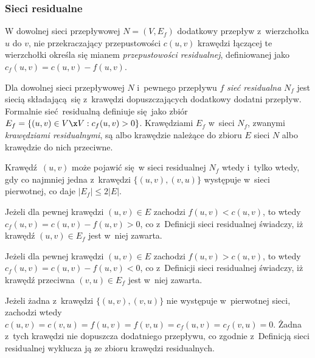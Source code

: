 \subsubsection{\textbf{Sieci residualne}}
\par{
  W dowolnej sieci przepływowej $N=(V, E_f)$ dodatkowy przepływ z~wierzchołka $u$ do $v$, nie przekraczający przepustowości $c(u, v)$ krawędzi łączącej te wierzchołki określa się mianem \emph{przepustowości residualnej}, definiowanej jako $c_f(u ,v) = c(u, v) - f(u, v)$.
  \begin{definition}
    Dla dowolnej sieci przepływowej $N$ i~pewnego przepływu $f$ \emph{sieć residualna} $N_f$ jest siecią składającą się z~krawędzi dopuszczających dodatkowy dodatni przepływ. Formalnie sieć residualną definiuje się jako zbiór $E_f=\{(u, v) \in V \x V: c_f(u,v) > 0\}$.
    Krawędziami $E_f$ w~sieci $N_f$, zwanymi \emph{krawędziami residualnymi}, są albo krawędzie należące do zbioru $E$ sieci $N$ albo krawędzie do nich przeciwne.
  \end{definition}
  \begin{theorem}
    Krawędź $(u, v)$ może pojawić się w sieci residualnej $N_f$ wtedy i~tylko wtedy, gdy co najmniej jedna z~krawędzi $\{(u, v), (v, u)\}$ występuje w~sieci pierwotnej, co daje $|E_f| \leq 2|E|$.
  \end{theorem}
  \begin{bproof}
    Jeżeli dla pewnej krawędzi $(u, v) \in E$ zachodzi $f(u, v) < c(u, v)$, to wtedy $c_f(u, v) = c(u, v) - f(u, v) > 0$, co z~Definicji sieci residualnej świadczy, iż krawędź $(u, v) \in E_f$ jest w~niej zawarta.

    Jeżeli dla pewnej krawędzi $(u, v) \in E$ zachodzi $f(u, v) > c(u, v)$, to wtedy $c_f(u, v) = c(u, v) - f(u, v) < 0$, co z~Definicji sieci residualnej świadczy, iż krawędź przeciwna $(v, u) \in E_f$  jest w~niej zawarta.

    Jeżeli żadna z~krawędzi $\{(u, v), (v, u)\}$ nie występuje w~pierwotnej sieci, zachodzi wtedy $c(u, v) = c(v, u) = f(u, v) = f(v, u) = c_f(u, v) = c_f(v, u)=0$. Żadna z~tych krawędzi nie dopuszcza dodatniego przepływu, co zgodnie z~Definicją sieci residualnej wyklucza ją ze zbioru krawędzi residualnych.
  \end{bproof}
}

